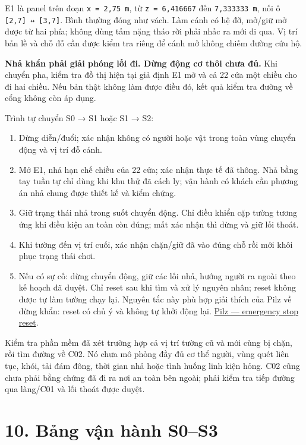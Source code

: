 \documentclass[
  11pt,
  a4paper,
]{article}
\providecommand{\tightlist}{%
  \setlength{\itemsep}{0pt}\setlength{\parskip}{0pt}}
\begin{document}
E1 là panel trên đoạn \texttt{x\ =\ 2,75\ m}, từ \texttt{z\ =\ 6,416667}
đến \texttt{7,333333\ m}, nối ô \texttt{{[}2,7{]}\ ↔\ {[}3,7{]}}. Bình
thường đóng như vách. Làm cánh có hệ đỡ, mở/giữ mở được từ hai phía;
không dùng tấm nặng tháo rời phải nhấc ra mới đi qua. Vị trí bản lề và
chỗ đỗ cần được kiểm tra riêng để cánh mở không chiếm đường cứu hộ.

\textbf{Nhả khẩn phải giải phóng lối đi. Dừng động cơ thôi chưa đủ.} Khi
chuyển pha, kiểm tra đồ thị hiện tại giả định E1 mở và cả 22 cửa một
chiều cho đi hai chiều. Nếu bản thật không làm được điều đó, kết quả
kiểm tra đường về cổng không còn áp dụng.

Trình tự chuyển S0 → S1 hoặc S1 → S2:

\begin{enumerate}
\def\labelenumi{\arabic{enumi}.}
\tightlist
\item
  Dừng diễn/đuổi; xác nhận không có người hoặc vật trong toàn vùng
  chuyển động và vị trí đỗ cánh.
\item
  Mở E1, nhả hạn chế chiều của 22 cửa; xác nhận thực tế đã thông. Nhả
  bằng tay tuần tự chỉ dùng khi khu thử đã cách ly; vận hành có khách
  cần phương án nhả chung được thiết kế và kiểm chứng.
\item
  Giữ trạng thái nhả trong suốt chuyển động. Chỉ điều khiển cặp tường
  tương ứng khi điều kiện an toàn còn đúng; mất xác nhận thì dừng và giữ
  lối thoát.
\item
  Khi tường đến vị trí cuối, xác nhận chặn/giữ đã vào đúng chỗ rồi mới
  khôi phục trạng thái chơi.
\item
  Nếu có sự cố: dừng chuyển động, giữ các lối nhả, hướng người ra ngoài
  theo kế hoạch đã duyệt. Chỉ reset sau khi tìm và xử lý nguyên nhân;
  reset không được tự làm tường chạy lại. Nguyên tắc này phù hợp giải
  thích của Pilz về dừng khẩn: reset có chủ ý và không tự khởi động lại.
  \href{https://www.pilz.com/en-IE/support/faq/standards/articles/180045}{Pilz
  --- emergency stop reset}.
\end{enumerate}

Kiểm tra phần mềm đã xét trường hợp cả vị trí tường cũ và mới cùng bị
chặn, rồi tìm đường về C02. Nó chưa mô phỏng đầy đủ cơ thể người, vùng
quét liên tục, khói, tải đám đông, thời gian nhả hoặc tình huống linh
kiện hỏng. C02 cũng chưa phải bằng chứng đã đi ra nơi an toàn bên ngoài;
phải kiểm tra tiếp đường qua làng/C01 và lối thoát được duyệt.

\section{10. Bảng vận hành
S0--S3}\label{bux1ea3ng-vux1eadn-huxe0nh-s0s3}
\end{document}
